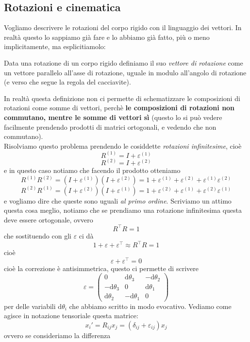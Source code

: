 \documentclass[11pt]{scrartcl}
\newcommand{\dif}{\text{d}}
\begin{document}
	\subsection{Rotazioni e cinematica}
	Vogliamo descrivere le rotazioni del corpo rigido con il linguaggio dei vettori. In realtà questo lo sappiamo già fare e lo abbiamo già fatto, più o meno implicitamente, ma esplicitiamolo:
	\begin{definition}
		Data una rotazione di un corpo rigido definiamo il suo \textit{vettore di rotazione} come un vettore parallelo all'asse di rotazione, uguale in modulo all'angolo di rotazione (e verso che segue la regola del cacciavite).
	\end{definition}
	In realtà questa definizione non ci permette di schematizzare le composizioni di rotazioni come somme di vettori, perchè \textbf{le composizioni di rotazioni non commutano, mentre le somme di vettori sì} (questo lo si può vedere facilmente prendendo prodotti di matrici ortogonali, e vedendo che non commutano). \\
	Risolviamo questo problema prendendo le cosiddette \textit{rotazioni infinitesime}, cioè
	$$R^{(1)}=I+\varepsilon^{(1)}$$
	$$R^{(2)}=I+\varepsilon^{(2)}$$
	e in questo caso notiamo che facendo il prodotto otteniamo
	$$R^{(1)}R^{(2)}=(I+\varepsilon^{(1)})(I+\varepsilon^{(2)})=1+\varepsilon^{(1)}+\varepsilon^{(2)}+\varepsilon^{(1)}\varepsilon^{(2)}$$
	$$R^{(2)}R^{(1)}=(I+\varepsilon^{(2)})(I+\varepsilon^{(1)})=1+\varepsilon^{(2)}+\varepsilon^{(1)}+\varepsilon^{(2)}\varepsilon^{(1)}$$
	e vogliamo dire che queste sono uguali \textit{al primo ordine}. Scriviamo un attimo questa cosa meglio, notiamo che se prendiamo una rotazione infinitesima questa deve essere ortogonale, ovvero
	$$R^\intercal R=1$$
	che sostituendo con gli $\varepsilon$ ci dà
	$$1+\varepsilon+\varepsilon^\intercal\approx R^\intercal R=1$$
	cioè 
	$$\varepsilon+\varepsilon^\intercal=0$$
	cioè la correzione è antisimmetrica, questo ci permette di scrivere
	$$
	\varepsilon=
	\begin{pmatrix}
		0 & \dif \theta_3 & -\dif \theta_2 \\
		-\dif \theta_3 & 0 & \dif \theta_1 \\
		\dif \theta_2 & -\dif \theta_1 & 0
	\end{pmatrix}
	$$
	per delle variabili $\dif \theta_i$ che abbiamo scritto in modo evocativo. Vediamo come agisce in notazione tensoriale questa matrice:
	$$x_i'=R_{ij}x_j=(\delta_{ij}+\varepsilon_{ij})x_j$$
	ovvero se consideriamo la differenza
\end{document}
